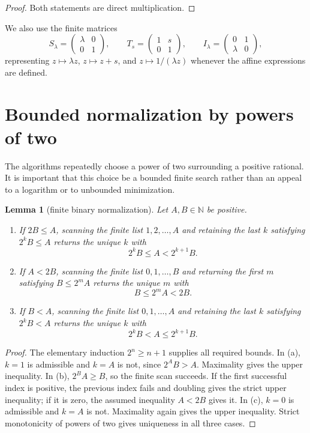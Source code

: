 \documentclass[10pt]{article}
\newtheorem{lemma}[theorem]{Lemma}
\theoremstyle{definition}
\theoremstyle{remark}
\newcommand{\N}{\mathbb{N}}
\newcommand{\mat}[4]{\begin{pmatrix}#1&#2\\#3&#4\end{pmatrix}}
\begin{document}
\begin{proof}
Both statements are direct multiplication.
\end{proof}

We also use the finite matrices
\[
 S_\lambda=\mat{\lambda}{0}{0}{1},\qquad
 T_s=\mat{1}{s}{0}{1},\qquad
 I_\lambda=\mat{0}{1}{\lambda}{0},
\]
representing $z\mapsto\lambda z$, $z\mapsto z+s$, and $z\mapsto1/(\lambda z)$ whenever the affine expressions are defined.

\section{Bounded normalization by powers of two}

The algorithms repeatedly choose a power of two surrounding a positive rational.  It is important that this choice be a bounded finite search rather than an appeal to a logarithm or to unbounded minimization.

\begin{lemma}[finite binary normalization]\label{lem:finite-normalization}
Let $A,B\in\N$ be positive.
\begin{enumerate}[label=\textup{(\alph*)}]
\item If $2B\le A$, scanning the finite list $1,2,\ldots,A$ and retaining the last $k$ satisfying $2^kB\le A$ returns the unique $k$ with
\[
 2^kB\le A<2^{k+1}B.
\]
\item If $A<2B$, scanning the finite list $0,1,\ldots,B$ and returning the first $m$ satisfying $B\le2^mA$ returns the unique $m$ with
\[
 B\le2^mA<2B.
\]
\item If $B<A$, scanning the finite list $0,1,\ldots,A$ and retaining the last $k$ satisfying $2^kB<A$ returns the unique $k$ with
\[
 2^kB<A\le2^{k+1}B.
\]
\end{enumerate}
\end{lemma}

\begin{proof}
The elementary induction $2^n\ge n+1$ supplies all required bounds.  In (a), $k=1$ is admissible and $k=A$ is not, since $2^AB>A$.  Maximality gives the upper inequality.  In (b), $2^BA\ge B$, so the finite scan succeeds.  If the first successful index is positive, the previous index fails and doubling gives the strict upper inequality; if it is zero, the assumed inequality $A<2B$ gives it.  In (c), $k=0$ is admissible and $k=A$ is not.  Maximality again gives the upper inequality.  Strict monotonicity of powers of two gives uniqueness in all three cases.
\end{proof}
\end{document}
